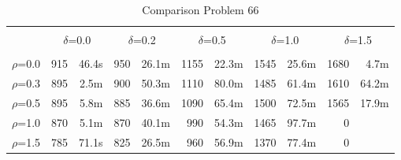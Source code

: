 \begin{table}[!htb]
\centering
{\renewcommand{\tabcolsep}{2pt}
\caption{Comparison Problem 66\label{problem66Comparison}}
\vspace{-0.75em}
\begin{tabular}{l|rrrrrrrrrr}
\hline \\ [-1.8ex]
& \multicolumn{2}{c}{$\delta$=0.0}& \multicolumn{2}{c}{$\delta$=0.2}& \multicolumn{2}{c}{$\delta$=0.5}& \multicolumn{2}{c}{$\delta$=1.0}& \multicolumn{2}{c}{$\delta$=1.5}\\
\hline \\ [-1.8ex]
$\rho$=0.0 & 915 & 46.4s & 950 & 26.1m & 1155 & 22.3m & 1545 & 25.6m & 1680 & 4.7m \\
$\rho$=0.3 & 895 & 2.5m & 900 & 50.3m & 1110 & 80.0m & 1485 & 61.4m & 1610 & 64.2m \\
$\rho$=0.5 & 895 & 5.8m & 885 & 36.6m & 1090 & 65.4m & 1500 & 72.5m & 1565 & 17.9m \\
$\rho$=1.0 & 870 & 5.1m & 870 & 40.1m & 990 & 54.3m & 1465 & 97.7m & 0 &  \\
$\rho$=1.5 & 785 & 71.1s & 825 & 26.5m & 960 & 56.9m & 1370 & 77.4m & 0 &  \\
 \hline
\end{tabular}
}
\end{table}

